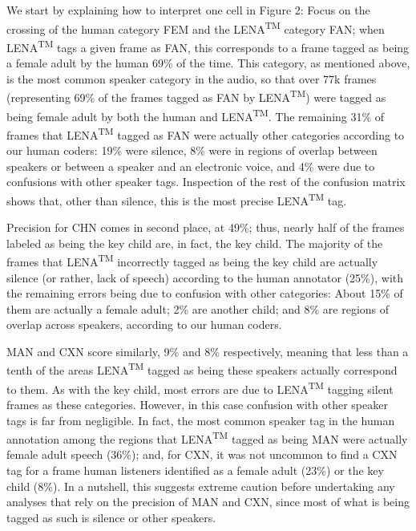 \documentclass[english,floatsintext,man]{apa6}
\begin{document}
We start by explaining how to interpret one cell in Figure 2: Focus on
the crossing of the human category FEM and the LENA\textsuperscript{TM}
category FAN; when LENA\textsuperscript{TM} tags a given frame as FAN,
this corresponds to a frame tagged as being a female adult by the human
69\% of the time. This category, as mentioned above, is the most common
speaker category in the audio, so that over 77k frames (representing
69\% of the frames tagged as FAN by LENA\textsuperscript{TM}) were
tagged as being female adult by both the human and
LENA\textsuperscript{TM}. The remaining 31\% of frames that
LENA\textsuperscript{TM} tagged as FAN were actually other categories
according to our human coders: 19\% were silence, 8\% were in regions of
overlap between speakers or between a speaker and an electronic voice,
and 4\% were due to confusions with other speaker tags. Inspection of
the rest of the confusion matrix shows that, other than silence, this is
the most precise LENA\textsuperscript{TM} tag.

Precision for CHN comes in second place, at 49\%; thus, nearly half of
the frames labeled as being the key child are, in fact, the key child.
The majority of the frames that LENA\textsuperscript{TM} incorrectly
tagged as being the key child are actually silence (or rather, lack of
speech) according to the human annotator (25\%), with the remaining
errors being due to confusion with other categories: About 15\% of them
are actually a female adult; 2\% are another child; and 8\% are regions
of overlap across speakers, according to our human coders.

MAN and CXN score similarly, 9\% and 8\% respectively, meaning that less
than a tenth of the areas LENA\textsuperscript{TM} tagged as being these
speakers actually correspond to them. As with the key child, most errors
are due to LENA\textsuperscript{TM} tagging silent frames as these
categories. However, in this case confusion with other speaker tags is
far from negligible. In fact, the most common speaker tag in the human
annotation among the regions that LENA\textsuperscript{TM} tagged as
being MAN were actually female adult speech (36\%); and, for CXN, it was
not uncommon to find a CXN tag for a frame human listeners identified as
a female adult (23\%) or the key child (8\%). In a nutshell, this
suggests extreme caution before undertaking any analyses that rely on
the precision of MAN and CXN, since most of what is being tagged as such
is silence or other speakers.
\end{document}
